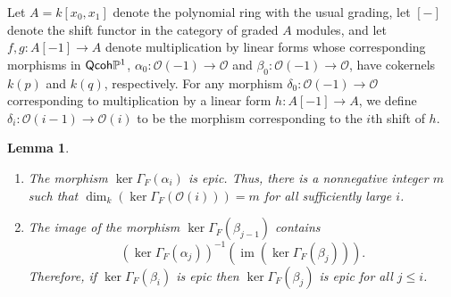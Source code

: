 \documentclass[10pt]{amsart}
\newtheorem{lemma}{Lemma}[section]
\theoremstyle{definition}
\theoremstyle{remark}
\numberwithin{equation}{section}
\begin{document}
Let $A=k[x_{0},x_{1}]$ denote the polynomial ring with the usual grading, let $[-]$ denote the shift functor in the category of graded $A$ modules, and let $f,g:A[-1] \rightarrow A$ denote multiplication by linear forms whose corresponding morphisms in ${\sf Qcoh}\mathbb{P}^{1}$, $\alpha_{0}:\mathcal{O}(-1) \rightarrow \mathcal{O}$ and $\beta_{0}:\mathcal{O}(-1) \rightarrow \mathcal{O}$, have cokernels $k(p)$ and $k(q)$, respectively. For any morphism $\delta_{0}:\mathcal{O}(-1) \rightarrow \mathcal{O}$ corresponding to multiplication by a linear form $h:A[-1] \rightarrow A$, we define $\delta_{i}:\mathcal{O}(i-1) \rightarrow \mathcal{O}(i)$ to be the morphism corresponding to the $i$th shift of $h$.

\begin{lemma} \label{lemma.alphabetaepi}
\begin{enumerate}
\item The morphism ${\operatorname{ker }\Gamma_{F}}(\alpha_{i})$ is epic.  Thus, there is a nonnegative integer $m$ such that $\operatorname{dim }_{k}({\operatorname{ker }\Gamma_{F}}(\mathcal{O}(i)))=m$ for all sufficiently large $i$.

\item The image of the morphism ${\operatorname{ker }\Gamma_{F}}(\beta_{j-1})$ contains
$$
({\operatorname{ker }\Gamma_{F}}(\alpha_{j}))^{-1}(\operatorname{im }({\operatorname{ker }\Gamma_{F}}(\beta_{j}))).
$$
Therefore, if ${\operatorname{ker }\Gamma_{F}}(\beta_{i})$ is epic then ${\operatorname{ker }\Gamma_{F}}(\beta_{j})$ is epic for all $j \leq i$.
\end{enumerate}
\end{lemma}
\end{document}
